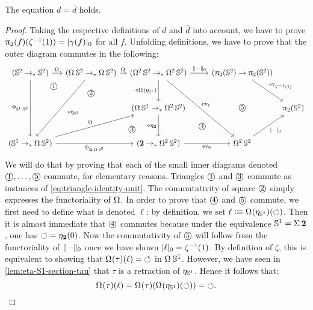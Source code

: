 \documentclass[english,a4paper]{lmcs}
\begin{document}
\begin{prop}
  The equation $d=\bar d$ holds.
  \label{prop:alternative-description-degree}
\end{prop}
\begin{proof}
  Taking the respective definitions of $d$ and $\bar d$ into account,
  we have to prove $\uppi_{2} (f)({\zeta^{-1}(1)})= \lvert\gamma(f)\rvert_0$ for all $f$.
  Unfolding definitions,
  we have to prove that the outer diagram commutes in the following:
  \begin{displaymath}
    \begin{tikzcd}
      (\Sp \ptdto \Sp) \ar[r,"\loopspace\null"] \ar[dd,"\Phi_{\Sc,\Sp}"{swap}]
      \drar[phantom,"\circled{1}"{description, near start}]
      &[-15pt] (\loopspace \null \Sp \ptdto \loopspace\null\Sp) \ar[r,"\loopspace\null"] \ar[ddl,"\blank\circ\eta_{\Sc}"]
      \dar["\circled{2}", phantom]
      &[-15pt] (\loopspace 2 \Sp \ptdto \loopspace 2 \Sp) \ar[ddr,"\ev_\ell"]
      \ar[r,"\setTrunc\blank"] \dar["\blank\circ \loopspace\null(\eta_{\Sc})"swap]
      & (\hgr 2(\Sp) \to \hgr 2(\Sp)) \drar["\ev_{\inv\zeta(1)}"] \ar[dd,"\circled{5}", phantom] &[-20pt]
      \\[10pt]
      & {} \drar["\circled{3}"{near end}, phantom]
      & (\loopspace\null\Sc \ptdto \loopspace 2 \Sp) \dar["\blank\circ\eta_{\bn 2}"swap]
      \drar["\circled{4}", phantom] &
      & \hgr 2(\Sp)
      \\[10pt]
      (\Sc \ptdto \loopspace\null\Sp) \ar[rr,"\Phi_{\bn 2,\loopspace\null\Sp}"swap] \ar[urr,"\loopspace\null"] &
      & (\bn 2 \ptdto \loopspace 2 \Sp) \rar["\ev_0"swap] & \loopspace 2 \Sp \urar["\settrunc\blank"swap] &
    \end{tikzcd}
  \end{displaymath}
  We will do that by proving that each of the small inner diagrams
  denoted $\textrm{\textcircled{\small 1}},\dots,\textrm{\textcircled{\small 5}}$ commute, for elementary
  reasons. Triangles $\textrm{\textcircled{\small 1}}$ and $\textrm{\textcircled{\small 3}}$ commute as
  instances of \cref{eq:triangle-identity-unit}. The commutativity of
  square $\textrm{\textcircled{\small 2}}$ simply expresses the functoriality of
  $\loopspace\null$. In order to prove that $\textrm{\textcircled{\small 4}}$ and
  $\textrm{\textcircled{\small 5}}$ commute, we first need to define what is denoted
  $\ell$: by definition, we set
  $\ell \defequi \loopspace\null (\eta_\Sc)(\Sloop)$.  Then it is
  almost immediate that $\textrm{\textcircled{\small 4}}$ commutes because under the
  equivalence ${{\mathbb S^{1}}} = \operatorname{\Sigma} {\mathbf{2}}$, one has
  $\mathord{\circlearrowleft} = \eta_{\mathbf{2}}(0)$.  Now the commutativity of $\textrm{\textcircled{\small 5}}$
  will follow from the functoriality of $\setTrunc\blank$ once we have
  shown $\lvert\ell\rvert_0 = \zeta^{-1}(1)$. By definition of $\zeta$,
  this is equivalent to showing that
  $\loopspace\null(\tau) (\ell) = \Sloop$ in $\loopspace\null
  \Sc$. However, we have seen in \cref{lem:eta-S1-section-tau} that
  $\tau$ is a retraction of $\eta_{{{\mathbb S^{1}}}}$. Hence it follows that:
  \begin{displaymath}
    \loopspace\null(\tau)(\ell) = \loopspace\null(\tau)(\loopspace\null(\eta_\Sc)(\Sloop)) = \Sloop.\qedhere
  \end{displaymath}
\end{proof}
\end{document}

